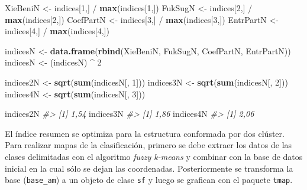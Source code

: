 \documentclass[11pt,b5paper,]{krantz}
\newenvironment{Shaded}{}{}
\newcommand{\CommentTok}[1]{\textcolor[rgb]{0.38,0.63,0.69}{\textit{#1}}}
\newcommand{\DecValTok}[1]{\textcolor[rgb]{0.25,0.63,0.44}{#1}}
\newcommand{\KeywordTok}[1]{\textcolor[rgb]{0.00,0.44,0.13}{\textbf{#1}}}
\newcommand{\NormalTok}[1]{#1}
\newcommand{\OperatorTok}[1]{\textcolor[rgb]{0.40,0.40,0.40}{#1}}
\newcommand{\StringTok}[1]{\textcolor[rgb]{0.25,0.44,0.63}{#1}}
\begin{document}
\begin{Shaded}
\begin{Highlighting}[]
\NormalTok{XieBeniN <-}\StringTok{ }\NormalTok{indices[}\DecValTok{1}\NormalTok{,] }\OperatorTok{/}\StringTok{ }\KeywordTok{max}\NormalTok{(indices[}\DecValTok{1}\NormalTok{,])}
\NormalTok{FukSugN <-}\StringTok{ }\NormalTok{indices[}\DecValTok{2}\NormalTok{,] }\OperatorTok{/}\StringTok{ }\KeywordTok{max}\NormalTok{(indices[}\DecValTok{2}\NormalTok{,])}
\NormalTok{CoefPartN <-}\StringTok{ }\NormalTok{indices[}\DecValTok{3}\NormalTok{,] }\OperatorTok{/}\StringTok{ }\KeywordTok{max}\NormalTok{(indices[}\DecValTok{3}\NormalTok{,])}
\NormalTok{EntrPartN <-}\StringTok{ }\NormalTok{indices[}\DecValTok{4}\NormalTok{,] }\OperatorTok{/}\StringTok{ }\KeywordTok{max}\NormalTok{(indices[}\DecValTok{4}\NormalTok{,])}

\NormalTok{indicesN <-}
\StringTok{  }\KeywordTok{data.frame}\NormalTok{(}\KeywordTok{rbind}\NormalTok{(XieBeniN, FukSugN, }
\NormalTok{                   CoefPartN, EntrPartN))}
\NormalTok{indicesN <-}\StringTok{ }\NormalTok{(indicesN) }\OperatorTok{^}\StringTok{ }\DecValTok{2}

\NormalTok{indices2N <-}\StringTok{ }\KeywordTok{sqrt}\NormalTok{(}\KeywordTok{sum}\NormalTok{(indicesN[, }\DecValTok{1}\NormalTok{]))}
\NormalTok{indices3N <-}\StringTok{ }\KeywordTok{sqrt}\NormalTok{(}\KeywordTok{sum}\NormalTok{(indicesN[, }\DecValTok{2}\NormalTok{]))}
\NormalTok{indices4N <-}\StringTok{ }\KeywordTok{sqrt}\NormalTok{(}\KeywordTok{sum}\NormalTok{(indicesN[, }\DecValTok{3}\NormalTok{]))}

\NormalTok{indices2N}
\CommentTok{#> [1] 1,54}
\NormalTok{indices3N}
\CommentTok{#> [1] 1,86}
\NormalTok{indices4N}
\CommentTok{#> [1] 2,06}
\end{Highlighting}
\end{Shaded}

El índice resumen se optimiza para la estructura conformada por dos clúster. Para realizar mapas de la clasificación, primero se debe extraer los datos de las clases delimitadas con el algoritmo \emph{fuzzy k-means} y combinar con la base de datos inicial en la cual sólo se dejan las coordenadas. Posteriormente se transforma la base (\texttt{base\_am}) a un objeto de clase \texttt{sf} y luego se grafican con el paquete \texttt{tmap}.
\end{document}

